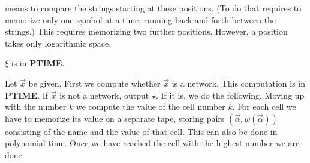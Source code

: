 means to compare the strings starting at these positions.  (To do that 
requires to memorize only one symbol at a time, running back and forth
between the strings.) This requires memorizing two further positions. 
However, a position takes only logarithmic space. 
\proofend
\begin{thm}
$\xi$ is in \textbf{PTIME}.
\end{thm}
\proofbeg
Let $\vec{x}$ be given. First we compute whether $\vec{x}$ is a
network. This computation is in \textbf{PTIME}. If $\vec{x}$ is not a network,
output $\star$. If it is, we do the following. Moving up with the
number $k$ we compute the value of the cell number $k$. For each
cell we have to memorize its value on a separate tape, storing
pairs $(\vec{\alpha}, w(\vec{\alpha}))$ consisting of the name
and the value of that cell. This can also be done in polynomial time.
Once we have reached the cell with the highest number we are done.
\proofend

